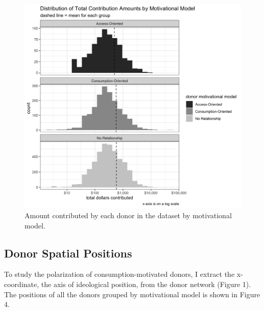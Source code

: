\documentclass[12pt,]{article}
\begin{document}
\begin{figure}
\centering
\includegraphics{../tables_and_figures/fig_donor_sizes.jpg}
\caption{Amount contributed by each donor in the dataset by motivational
model.}
\end{figure}

\hypertarget{donor-spatial-positions}{%
\subsection{Donor Spatial Positions}\label{donor-spatial-positions}}

To study the polarization of consumption-motivated donors, I extract the
x-coordinate, the axis of ideological position, from the donor network
(Figure 1). The positions of all the donors grouped by motivational
model is shown in Figure 4.
\end{document}
